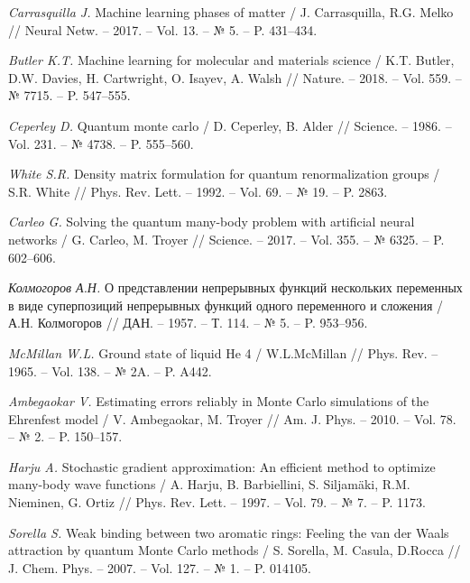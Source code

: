 \begin{thebibliography}{10}
    \textit{Carrasquilla J.} Machine learning phases of matter / 
    J. Carrasquilla, R.G. Melko //
    Neural Netw. -- 2017. -- Vol. 13. -- № 5. -- P. 431--434.
    
    \textit{Butler K.T.} Machine learning for molecular and materials science / 
    K.T. Butler, D.W. Davies, H. Cartwright, O. Isayev, A. Walsh //
    Nature. -- 2018. -- Vol. 559. -- № 7715. -- P. 547--555.
    
    \textit{Ceperley D.} Quantum monte carlo / 
    D. Ceperley, B. Alder //
    Science. -- 1986. -- Vol. 231. -- № 4738. -- P. 555--560.
    
    \textit{White S.R.} Density matrix formulation for quantum renormalization groups / 
    S.R. White //
    Phys. Rev. Lett. -- 1992. -- Vol. 69. -- № 19. -- P. 2863.
    
    \textit{Carleo G.} Solving the quantum many-body problem with artificial neural networks / 
    G. Carleo, M. Troyer //
    Science. -- 2017. -- Vol. 355. -- № 6325. -- P. 602--606.
    
    \textit{Колмогоров А.Н.} О представлении непрерывных функций нескольких переменных в виде суперпозиций непрерывных функций одного переменного и сложения / 
    А.Н. Колмогоров //
    ДАН. -- 1957. -- Т. 114. -- № 5. -- P. 953--956.
    
    \textit{McMillan W.L.} Ground state of liquid He 4 / 
    W.L.McMillan //
    Phys. Rev. -- 1965. -- Vol. 138. -- № 2A. -- P. A442.
    
    \textit{Ambegaokar V.} Estimating errors reliably in Monte Carlo simulations of the Ehrenfest model / 
    V. Ambegaokar, M. Troyer //
    Am. J. Phys. -- 2010. -- Vol. 78. -- № 2. -- P. 150--157.
    
    \textit{Harju A.} Stochastic gradient approximation: An efficient method to optimize many-body wave functions / 
    A. Harju, B. Barbiellini, S. Siljam{\"a}ki, R.M. Nieminen, G. Ortiz //
    Phys. Rev. Lett. -- 1997. -- Vol. 79. -- № 7. -- P. 1173.

    \textit{Sorella S.} Weak binding between two aromatic rings: Feeling the van der Waals attraction by quantum Monte Carlo methods / 
    S. Sorella, M. Casula, D.Rocca //
    J. Chem. Phys. -- 2007. -- Vol. 127. -- № 1. -- P. 014105.
    

\end{thebibliography}
